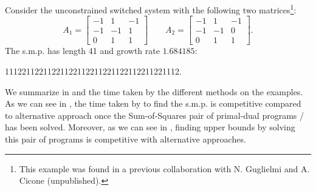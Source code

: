 \documentclass[11pt,twoside,a4paper,openright]{uclouvain-thesis}
\begin{document}
\begin{myexem}
  \label{exem:long_prod}
  Consider the unconstrained switched system with the following two matrices\footnote{This example was found in a previous collaboration with N. Guglielmi and A. Cicone (unpublished).}:
  \[
    A_1 = \begin{bmatrix}
      -1 &  1 & -1\\
      -1 & -1 &  1\\
       0 &  1 &  1
    \end{bmatrix} \qquad
    A_2 = \begin{bmatrix}
      -1 &  1 & -1\\
      -1 & -1 &  0\\
       0 &  1 &  1
    \end{bmatrix}.
  \]
  The s.m.p. has length 41 and growth rate $1.684185$:
  \begin{center}
    11122112211221122112211221122112211221112.
  \end{center}
\end{myexem}

We summarize in  and  the time taken by the different methods on the examples.
As we can see in , the time taken by  to find the s.m.p. is competitive compared
to alternative approach once the Sum-of-Squares pair of primal-dual programs / has been solved.
Moreover, as we can see in , finding upper bounds by solving this pair of programs is
competitive with alternative approaches.
\end{document}
